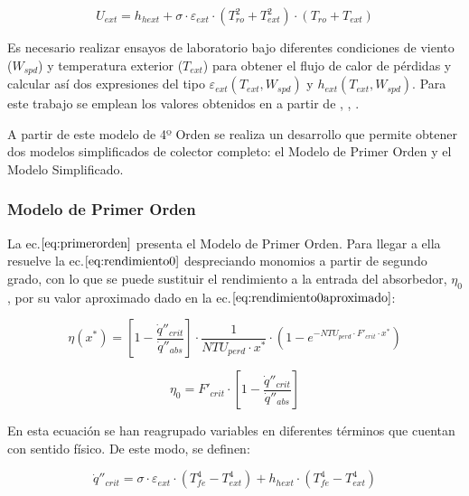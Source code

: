 \documentclass[11pt]{article}
\begin{document}
\begin{equation}
    U_{ext} = h_{hext} + \sigma \cdot \varepsilon_{ext} \cdot \left(T_{ro}^2 + T_{ext}^2 \right) \cdot \left(T_{ro} + T_{ext} \right)
    \label{eq:uext}
\end{equation}

Es necesario realizar ensayos de laboratorio bajo diferentes condiciones
de viento (\(W_{spd}\)) y temperatura exterior (\(T_{ext}\)) para
obtener el flujo de calor de pérdidas y calcular así dos expresiones del
tipo \(\varepsilon_{ext}(T_{ext},W_{spd})\) y
\(h_{ext}(T_{ext},W_{spd})\). Para este trabajo se emplean los valores
obtenidos en \cite{1022085/7TD8VTGL} a partir de
\cite{1022085/2CSZR6MB}, \cite{1022085/Z2N8UMZB},
\cite{1022085/8AF3BT7W} .

A partir de este modelo de 4º Orden se realiza un desarrollo que permite
obtener dos modelos simplificados de colector completo: el Modelo de
Primer Orden y el Modelo Simplificado.

\hypertarget{modelo-de-primer-orden}{%
\subsubsection{Modelo de Primer Orden}\label{modelo-de-primer-orden}}

La ec.\(\eqref{eq:primerorden}\) presenta el Modelo de Primer Orden.
Para llegar a ella resuelve la ec.\(\eqref{eq:rendimiento0}\)
despreciando monomios a partir de segundo grado, con lo que se puede
sustituir el rendimiento a la entrada del absorbedor, \(\eta_{0}\), por
su valor aproximado dado en la ec.\(\eqref{eq:rendimiento0aproximado}\):

\begin{equation}
    \eta(x^{*}) = \left[1-\frac{\dot q''_{crit}}{\dot q''_{abs}}\right] \cdot \frac{1}{NTU_{perd} \cdot x^{*}} \cdot \left(1-e^{-NTU_{perd}\cdot F'_{crit}\cdot x^{*}}\right) 
    \label{eq:primerorden}
\end{equation}

\begin{equation}
    \eta_{0} = F'_{crit} \cdot \left[1-\frac{\dot q''_{crit}}{\dot q''_{abs}}\right] 
    \label{eq:rendimiento0aproximado}
\end{equation}

En esta ecuación se han reagrupado variables en diferentes términos que
cuentan con sentido físico. De este modo, se definen:

\begin{equation}
    \dot q''_{crit} = \sigma \cdot \varepsilon_{ext} \cdot \left(T^{4}_{fe}- T^{4}_{ext}\right)+h_{hext} \cdot \left(T^{4}_{fe}- T^{4}_{ext}\right)
    \label{eq:qcrit}
\end{equation}
\end{document}

